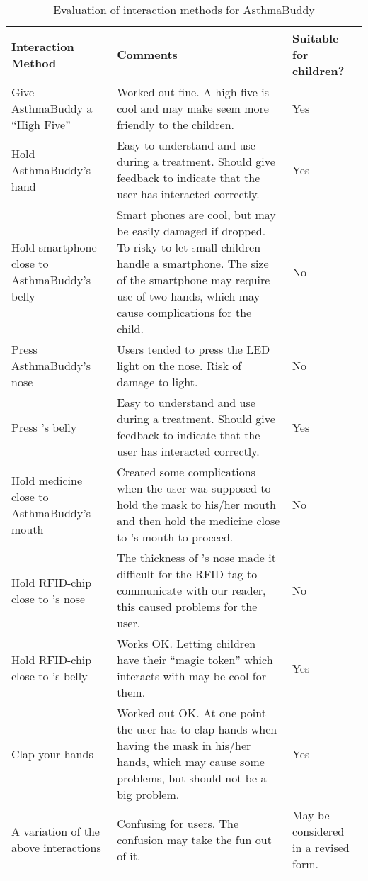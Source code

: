 \begin{table}[H]
\begin{tabular}{|p{4.0cm} | p{7.5cm} | p{2.5cm} |}
\hline 
\textbf{Interaction Method} & \textbf{Comments} & \textbf{Suitable for children?}\\
\hline
	Give AsthmaBuddy a ``High Five'' & Worked out fine. A high five is cool and may make \ab{} seem more friendly to the children. & Yes \\
\hline
	Hold AsthmaBuddy's hand & Easy to understand and use during a treatment. Should give feedback to indicate that the user has interacted correctly. & Yes\\
\hline
	Hold smartphone close to AsthmaBuddy's belly & Smart phones are cool, but may be easily damaged if dropped. To risky to let small children handle a smartphone. The size of the smartphone may require use of two hands, which may cause complications for the child. & No \\
\hline
	Press AsthmaBuddy's nose & Users tended to press the LED light on the nose. Risk of damage to light. & No\\
\hline
	Press \buddy{}'s belly & Easy to understand and use during a treatment. Should give feedback to indicate that the user has interacted correctly. & Yes\\
\hline
	Hold medicine close to AsthmaBuddy's mouth & Created some complications when the user was supposed to hold the mask to his/her mouth and then hold the medicine close to \ab{}'s mouth to proceed. & No \\
\hline
	Hold RFID-chip close to \buddy{}'s nose & The thickness of \buddy{}'s nose made it difficult for the RFID tag to communicate with our reader, this caused problems for the user. & No \\
\hline
	Hold RFID-chip close to \buddy{}'s belly & Works OK. Letting children have their ``magic token'' which interacts with \ab{} may be cool for them. & Yes\\
\hline
	Clap your hands & Worked out OK. At one point the user has to clap hands when having the mask in his/her hands, which may cause some problems, but should not be a big problem. & Yes\\
\hline
	A variation of the above interactions & Confusing for users. The confusion may take the fun out of it. & May be considered in a revised form.\\
\hline
\end{tabular}
\caption{Evaluation of interaction methods for AsthmaBuddy}
\label{tab:interactioneval}
\end{table}

